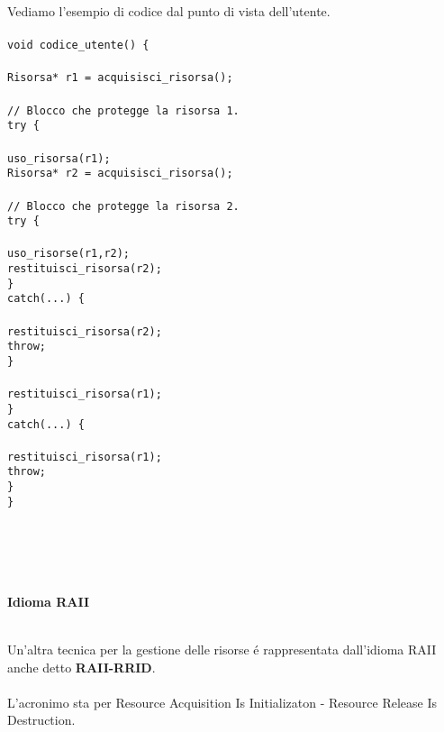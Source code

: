 \documentclass{article}
\newcommand\tab[1][1cm]{\hspace*{#1}}
\begin{document}
Vediamo l'esempio di codice dal punto di vista dell'utente.\\ \\
\texttt{void codice\_utente() \{ \\ \\ \tab Risorsa* r1 = acquisisci\_risorsa(); \\ \\ \tab \textcolor{grigio}{// Blocco che protegge la risorsa 1.} \\ \tab try \{ \\ \\ \tab \tab uso\_risorsa(r1); \\ \tab \tab Risorsa* r2 = acquisisci\_risorsa(); \\ \\ \tab \tab \textcolor{grigio}{// Blocco che protegge la risorsa 2.} \\ \tab \tab try \{ \\ \\ \tab \tab \tab uso\_risorse(r1,r2); \\ \tab \tab \tab restituisci\_risorsa(r2); \\ \tab \tab \} \\ \tab \tab catch(...) \{ \\ \\ \tab \tab \tab restituisci\_risorsa(r2); \\ \tab \tab \tab throw; \\ \tab \tab \} \\ \\ \tab \tab restituisci\_risorsa(r1); \\ \tab \} \\ \tab catch(...) \{ \\ \\ \tab \tab restituisci\_risorsa(r1); \\ \tab \tab throw; \\ \tab \} \\ \}} 
\\ \\ \\ \\ \\
\begin{large}\textbf{\textcolor{blu}{Idioma RAII}} \\ \\ \end{large}
Un'altra tecnica per la gestione delle risorse \'e rappresentata dall'idioma RAII anche detto \textbf{RAII-RRID}.\\ \\ L'acronimo sta per Resource Acquisition Is Initializaton - Resource Release Is Destruction. \\ \\
\end{document}
